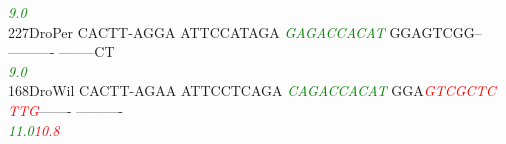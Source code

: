 \documentclass[11pt,twoside,reqno,a4paper]{article}
\begin{document}
{\hspace*{4\charwidth}\hspace*{7\charwidth}\hspace*{1\charwidth}\hspace*{1\charwidth}\hspace*{20\charwidth}\textit{\textcolor{Green}{9.0}}\hspace*{1\charwidth}\hspace*{1\charwidth}\hspace*{1\charwidth}\hspace*{1\charwidth}\\
227\hspace*{1\charwidth}DroPer	CACTT-AGGA	ATTCCATAGA	\textit{\textcolor{Green}{G}}\textit{\textcolor{Green}{A}}\textit{\textcolor{Green}{G}}\textit{\textcolor{Green}{A}}\textit{\textcolor{Green}{C}}\textit{\textcolor{Green}{C}}\textit{\textcolor{Green}{A}}\textit{\textcolor{Green}{C}}\textit{\textcolor{Green}{A}}\textit{\textcolor{Green}{T}}	GGAGTCGG--	----------	--------CT	\\
\hspace*{4\charwidth}\hspace*{7\charwidth}\hspace*{1\charwidth}\hspace*{1\charwidth}\hspace*{20\charwidth}\textit{\textcolor{Green}{9.0}}\hspace*{1\charwidth}\hspace*{1\charwidth}\hspace*{1\charwidth}\hspace*{1\charwidth}\\
168\hspace*{1\charwidth}DroWil	CACTT-AGAA	ATTCCTCAGA	\textit{\textcolor{Green}{C}}\textit{\textcolor{Green}{A}}\textit{\textcolor{Green}{G}}\textit{\textcolor{Green}{A}}\textit{\textcolor{Green}{C}}\textit{\textcolor{Green}{C}}\textit{\textcolor{Green}{A}}\textit{\textcolor{Green}{C}}\textit{\textcolor{Green}{A}}\textit{\textcolor{Green}{T}}	GGA\textit{\textcolor{Red}{G}}\textit{\textcolor{Red}{T}}\textit{\textcolor{Red}{C}}\textit{\textcolor{Red}{G}}\textit{\textcolor{Red}{C}}\textit{\textcolor{Red}{T}}\textit{\textcolor{Red}{C}}	\textit{\textcolor{Red}{T}}\textit{\textcolor{Red}{T}}\textit{\textcolor{Red}{G}}-------	----------	\\
\hspace*{4\charwidth}\hspace*{7\charwidth}\hspace*{1\charwidth}\hspace*{1\charwidth}\hspace*{20\charwidth}\textit{\textcolor{Green}{11.0}}\hspace*{1\charwidth}\hspace*{9\charwidth}\textit{\textcolor{Red}{10.8}}\hspace*{1\charwidth}\hspace*{1\charwidth}\hspace*{1\charwidth}\\
}
\end{document}
